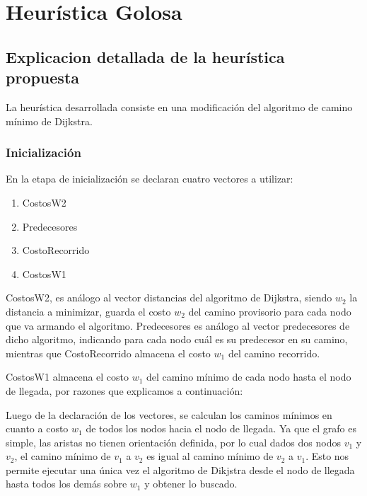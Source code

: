 \section{Heur\'istica Golosa}
\subsection{Explicacion detallada de la heur\'istica propuesta}

La heur\'istica desarrollada consiste en una modificaci\'on del algoritmo de camino m\'inimo de Dijkstra.

\subsubsection{Inicializaci\'on}

En la etapa de inicializaci\'on se declaran cuatro vectores a utilizar:

\begin{enumerate}

\item CostosW2
\item Predecesores
\item CostoRecorrido
\item CostosW1
\end{enumerate}

CostosW2, es an\'alogo al vector distancias del algoritmo de Dijkstra, siendo $w_2$ la distancia a minimizar, guarda el costo $w_2$ del camino provisorio para cada nodo que va armando el algoritmo. Predecesores es an\'alogo al vector predecesores de dicho algoritmo, indicando para cada nodo cu\'al es su predecesor en su camino, mientras que CostoRecorrido almacena el costo $w_1$ del camino recorrido.

\vspace{2mm}

CostosW1 almacena el costo $w_1$ del camino m\'inimo de cada nodo hasta el nodo de llegada, por razones que explicamos a continuaci\'on:

\vspace{2mm}

Luego de la declaraci\'on de los vectores, se calculan los caminos m\'inimos en cuanto a costo $w_1$ de todos los nodos hacia el nodo de llegada. Ya que el grafo es simple, las aristas no tienen orientaci\'on definida, por lo cual dados dos nodos $v_1$ y $v_2$, el camino m\'inimo de $v_1$ a $v_2$ es igual al camino m\'inimo de $v_2$ a $v_1$. Esto nos permite ejecutar una \'unica vez el algoritmo de Dikjstra desde el nodo de llegada hasta todos los dem\'as sobre $w_1$ y obtener lo buscado.

